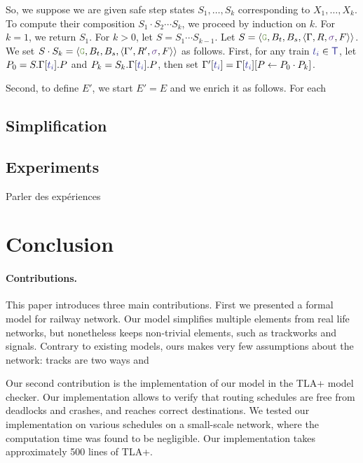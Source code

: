 \documentclass[runningheads]{llncs}
\newcommand{\swFmt}[1]{{\color{swcolor}{#1}}}
\newcommand{\switches}{\ensuremath{\swFmt{\sigma}}}
\newcommand{\trainFmt}[1]{{\color{traincolor} #1}}
\newcommand{\trains}{{\trainFmt{\mathsf{T}}}}
\newcommand{\tid}[1]{\ensuremath{\trainFmt{t_{#1}}}}
\newcommand{\regulator}{\ensuremath{R}}
\newcommand{\signals}{\ensuremath{F}}
\newcommand{\guardFmt}[1]{{\color{guardcolor} \ensuremath{\mathtt{#1}}}}
\newcommand{\guardG}{\guardFmt{G}}
\newcommand{\bufferFmt}[1]{#1}
\newcommand{\bufTrain}{\ensuremath{\bufferFmt{B_t}}\xspace}
\newcommand{\bufSig}{\ensuremath{\bufferFmt{B_s}}\xspace}
\begin{document}
So, we suppose we are given safe step states $S_1, \ldots, S_k$ corresponding to $X_1, \ldots, X_k$. To compute their composition $S_1 \cdot S_2 \cdots S_k$, we proceed by induction on $k$. For $k = 1$, we return $S_1$. For $k>0$, let $S = S_1 \cdots S_{k-1}$. Let $S = \langle \guardG, \bufTrain, \bufSig, \langle \Gamma, \regulator, \switches, \signals\rangle \rangle$. We set $S \cdot S_k = \langle \guardG, \bufTrain, \bufSig, \langle \Gamma', \regulator', \switches, \signals\rangle \rangle$ as follows. First,  for any train $\tid{i} \in \trains$, let $P_0 = S.\Gamma[\tid{i}].P$ and $P_k = S_k.\Gamma[\tid{i}].P$, then set $\Gamma'[\tid{i}] = \Gamma[\tid{i}][ P \leftarrow P_0 \cdot P_k]$. 

Second, to define $E'$, we start $E' = E$ and we enrich it as follows.  For each 

\subsection{Simplification}

\subsection{Experiments} 
Parler des expériences

\section{Conclusion}
\label{sec:conclusion}

\paragraph{Contributions.}
This paper introduces three main contributions. First we presented a formal model for railway network. Our model simplifies multiple elements from real life networks, but nonetheless keeps non-trivial elements, such as trackworks and signals. Contrary to existing models, ours makes very few assumptions about the network: tracks are two ways and 

Our second contribution is the implementation of our model in the TLA+ model checker. Our implementation allows to verify that routing schedules are free from deadlocks and crashes, and reaches correct destinations. We tested our implementation on various schedules on a small-scale network, where the computation time was found to be negligible. Our implementation takes approximately 500 lines of TLA+.
\end{document}
